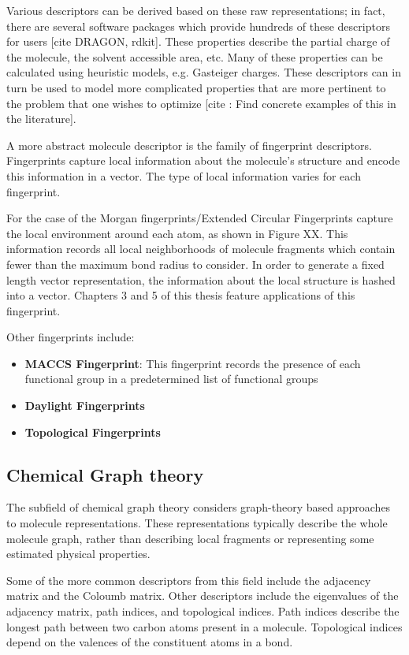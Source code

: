 Various descriptors can be derived based on these raw representations; in fact, there are several software packages which provide hundreds of these descriptors for users [cite DRAGON, rdkit]. These properties describe the partial charge of the molecule, the solvent accessible area, etc. Many of these properties can be calculated using heuristic models, e.g. Gasteiger charges. These descriptors can in turn be used to model more complicated properties that are more pertinent to the problem that one wishes to optimize [cite : Find concrete examples of this in the literature].

A more abstract molecule descriptor is the family of fingerprint descriptors. Fingerprints capture local information about the molecule's structure and encode this information in a vector. The type of local information varies for each fingerprint. 

For the case of the Morgan fingerprints/Extended Circular Fingerprints capture the local environment around each atom, as shown in Figure XX. This information records all local neighborhoods of molecule fragments which contain fewer than the maximum bond radius to consider. In order to generate a fixed length vector representation, the information about the local structure is hashed into a vector. Chapters 3 and 5 of this thesis feature applications of this fingerprint.

Other fingerprints include:

\begin{itemize}
\item \textbf{MACCS Fingerprint}: This fingerprint records the presence of each functional group in a predetermined list of functional groups
\item \textbf{Daylight Fingerprints}
\item \textbf{Topological Fingerprints}
\end{itemize}

\subsection{Chemical Graph theory}

The subfield of chemical graph theory considers graph-theory based approaches to molecule representations. These representations typically describe the whole molecule graph, rather than describing local fragments or representing some estimated physical properties.

Some of the more common descriptors from this field include the adjacency matrix and the Coloumb matrix. Other descriptors include the eigenvalues of the adjacency matrix, path indices, and topological indices. Path indices describe the longest path between two carbon atoms present in a molecule. Topological indices depend on the valences of the constituent atoms in a bond. 

